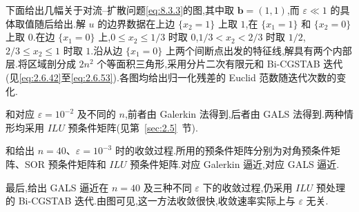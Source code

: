 \begin{example}[对流--扩散问题的迭代收敛]\label{ex:8.5-convergence}
下面给出几幅关于对流--扩散问题\eqref{eq:8.3.3}的图,其中取 \(\boldsymbol{b}=(1,1)\),而 \(\varepsilon\ll1\) 的具体取值随后给出.解 \(u\) 的边界数据在上边 \(\{x_2=1\}\) 上取 \(1\),在 \(\{x_1=1\}\) 和 \(\{x_2=0\}\) 上取 \(0\).在边 \(\{x_1=0\}\) 上,\(0\le x_2\le1/3\) 时取 \(0\),\(1/3<x_2<2/3\) 时取 \(1/2\),\(2/3\le x_2\le1\) 时取 \(1\).沿从边 \(\{x_1=0\}\) 上两个间断点出发的特征线,解具有两个内部层.将区域剖分成 \(2n^2\) 个等面积三角形,采用分片二次有限元和 Bi-CGSTAB 迭代(见\eqref{eq:2.6.42}至\eqref{eq:2.6.53}).各图均给出归一化残差的 Euclid 范数随迭代次数的变化.

和对应 \(\varepsilon=10^{-2}\) 及不同的 \(n\),前者由 Galerkin 法得到,后者由 GALS 法得到.两种情形均采用 \(ILU\) 预条件矩阵(见第~\ref{sec:2.5}~节).

和给出 \(n=40\)、\(\varepsilon=10^{-3}\) 时的收敛过程.所用的预条件矩阵分别为对角预条件矩阵、SOR 预条件矩阵和 \(ILU\) 预条件矩阵.对应 Galerkin 逼近,对应 GALS 逼近.

最后,给出 GALS 逼近在 \(n=40\) 及三种不同 \(\varepsilon\) 下的收敛过程,仍采用 \(ILU\) 预处理的 Bi-CGSTAB 迭代.由图可见,这一方法收敛很快,收敛速率实际上与 \(\varepsilon\) 无关.
\end{example}

